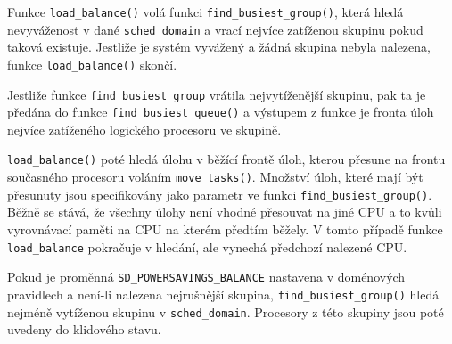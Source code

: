 \documentclass[
  master=true,
  font=sans,
  printversion=false,
  joinlists=true,
  figures=true,
  tables=true,
  sourcecodes=false,
  theorems=false,
  bibencoding=utf8,
  language=czech,
  encoding=utf8,
  field=ainfk,
  biblatex,
  glossaries,
  index
]{kidiplom}
\begin{document}
Funkce \verb#load_balance()# volá funkci \verb#find_busiest_group()#, která hledá nevyváženost v dané \verb#sched_domain# a vrací nejvíce zatíženou skupinu pokud taková existuje. Jestliže je systém vyvážený a žádná skupina nebyla nalezena, funkce \verb#load_balance()# skončí.

Jestliže funkce \verb#find_busiest_group# vrátila nejvytíženější skupinu, pak ta je předána do funkce \verb#find_busiest_queue()# a výstupem z funkce je fronta úloh nejvíce zatíženého logického procesoru ve skupině.

\verb#load_balance()# poté hledá úlohu v běžící frontě úloh, kterou přesune na frontu současného procesoru voláním \verb#move_tasks()#. Množství úloh, které mají být přesunuty jsou specifikovány jako parametr ve funkci \newline \verb#find_busiest_group()#. Běžně se stává, že všechny úlohy není vhodné přesouvat na jiné CPU a to kvůli vyrovnávací paměti na CPU na kterém předtím běžely. V tomto případě funkce \verb#load_balance# pokračuje v hledání, ale vynechá předchozí nalezené CPU.

Pokud je proměnná \verb#SD_POWERSAVINGS_BALANCE# nastavena v doménových pravidlech a není-li nalezena nejrušnější skupina, \verb#find_busiest_group()# hledá nejméně vytíženou skupinu v \verb#sched_domain#. Procesory z této skupiny jsou poté uvedeny do klidového stavu. 
\end{document}
